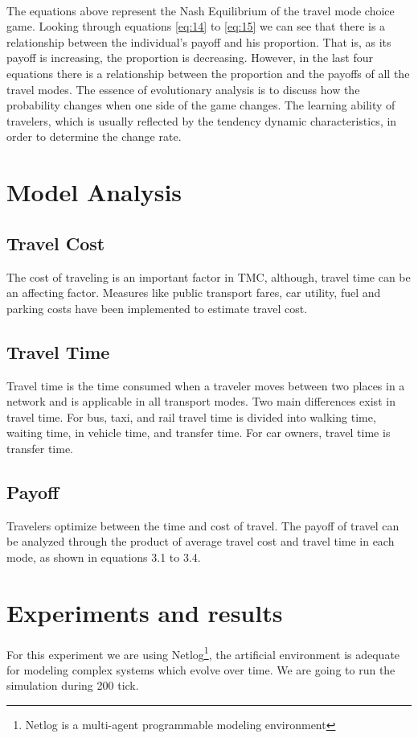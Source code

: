\paragraph{}The equations above represent the Nash Equilibrium of the travel mode choice game. Looking through equations \ref{eq:14} to \ref{eq:15} we can see that there is a relationship between the individual's payoff and his proportion. That is, as its payoff is increasing, the proportion is decreasing. However, in the last four equations there is a relationship between the proportion and the payoffs of all the travel modes.
The essence of evolutionary analysis is to discuss how the probability changes when one side of the game changes. The learning ability of travelers, which is usually reflected by the tendency dynamic characteristics, in order to determine the change rate.
\section{Model Analysis}
\subsection{Travel Cost}
The cost of traveling is an important factor in TMC, although, travel time can be an affecting factor. Measures like public transport fares, car utility, fuel and parking costs have been implemented to estimate travel cost.
\subsection{Travel Time}
Travel time is the time consumed when a traveler moves between two places in a network and is applicable in all transport modes. Two main differences exist in travel time. 
For bus, taxi, and rail travel time is divided into walking time, waiting time, in vehicle time, and transfer time. For car owners, travel time is transfer time. 
\subsection{Payoff}
Travelers optimize between the time and cost of travel. The payoff of travel can be analyzed through the product of average travel cost and travel time in each mode, as shown in equations 3.1 to 3.4.
\section{Experiments and results}
For this experiment we are using Netlog\footnote{Netlog is a multi-agent programmable modeling environment}, the artificial environment is adequate for modeling complex systems which evolve over time. We are going to run the simulation during 200 tick.

